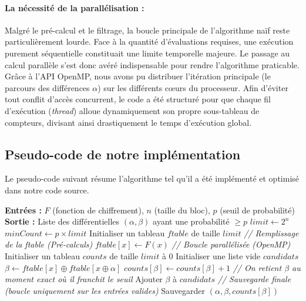 \documentclass[a4paper,11pt]{article}
\begin{document}
\paragraph{La nécessité de la parallélisation :}
Malgré le pré-calcul et le filtrage, la boucle principale de l'algorithme naïf reste particulièrement lourde. Face à la quantité d'évaluations requises, une exécution purement séquentielle constituait une limite temporelle majeure. Le passage au calcul parallèle s'est donc avéré indispensable pour rendre l'algorithme praticable. Grâce à l'API OpenMP, nous avons pu distribuer l'itération principale (le parcours des différences $\alpha$) sur les différents cœurs du processeur. Afin d'éviter tout conflit d'accès concurrent, le code a été structuré pour que chaque fil d'exécution (\textit{thread}) alloue dynamiquement son propre sous-tableau de compteurs, divisant ainsi drastiquement le temps d'exécution global.

\subsection{Pseudo-code de notre implémentation}

Le pseudo-code suivant résume l'algorithme tel qu'il a été implémenté et optimisé dans notre code source.

\begin{algorithm}[H]
\caption{Recherche Différentielle Naïve Optimisée (Génération de pDDT)}
\begin{algorithmic}[1]
\Statex \textbf{Entrées :} $F$ (fonction de chiffrement), $n$ (taille du bloc), $p$ (seuil de probabilité)
\Statex \textbf{Sortie :} Liste des différentielles $(\alpha, \beta)$ ayant une probabilité $\ge p$
\State $limit \gets 2^n$
\State $minCount \gets p \times limit$
\State Initialiser un tableau $ftable$ de taille $limit$
\State \textit{// Remplissage de la ftable (Pré-calculs)}
    \State $ftable[x] \gets F(x)$
\EndFor
\State \textit{// Boucle parallélisée (OpenMP)}
    \State Initialiser un tableau $counts$ de taille $limit$ à $0$
    \State Initialiser une liste vide $candidats$
        \State $\beta \gets ftable[x] \oplus ftable[x \oplus \alpha]$
        \State $counts[\beta] \gets counts[\beta] + 1$
        \textit{// On retient $\beta$ au moment exact où il franchit le seuil}
            \State Ajouter $\beta$ à $candidats$
        \EndIf
    \EndFor
    \State \textit{// Sauvegarde finale (boucle uniquement sur les entrées valides)}
        \State Sauvegarder $(\alpha, \beta, counts[\beta])$
    \EndFor
\EndFor
\end{algorithmic}
\end{algorithm}
\end{document}
